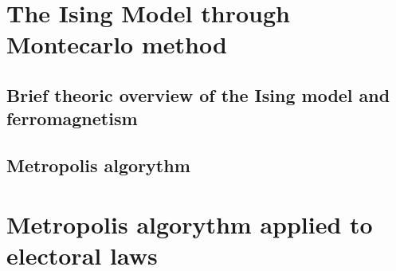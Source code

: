 \documentclass[12pt,a4paper,openright]{report}
\begin{document}
\chapter*{The Ising Model through Montecarlo method}

\section*{Brief theoric overview of the Ising model and ferromagnetism}
\section*{Metropolis algorythm}
\chapter*{Metropolis algorythm applied to electoral laws}
\end{document}
